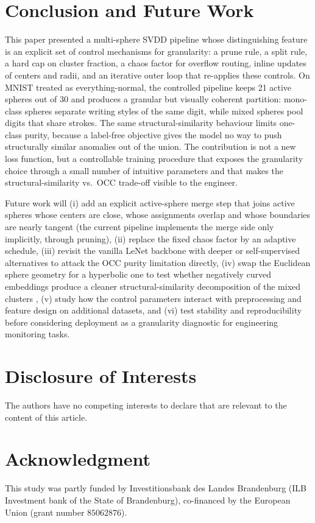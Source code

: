 \documentclass[conference]{IEEEtran}
\begin{document}
\section{Conclusion and Future Work}
This paper presented a multi-sphere SVDD pipeline whose distinguishing feature is an explicit set of control mechanisms for granularity: a prune rule, a split rule, a hard cap on cluster fraction, a chaos factor for overflow routing, inline updates of centers and radii, and an iterative outer loop that re-applies these controls. On MNIST \cite{lecun1998gradient} treated as everything-normal, the controlled pipeline keeps 21 active spheres out of 30 and produces a granular but visually coherent partition: mono-class spheres separate writing styles of the same digit, while mixed spheres pool digits that share strokes. The same structural-similarity behaviour limits one-class purity, because a label-free objective gives the model no way to push structurally similar anomalies out of the union. The contribution is not a new loss function, but a controllable training procedure that exposes the granularity choice through a small number of intuitive parameters and that makes the structural-similarity vs.\ OCC trade-off visible to the engineer.

Future work will (i) add an explicit active-sphere merge step that joins active spheres whose centers are close, whose assignments overlap and whose boundaries are nearly tangent (the current pipeline implements the merge side only implicitly, through pruning), (ii) replace the fixed chaos factor by an adaptive schedule, (iii) revisit the vanilla LeNet backbone with deeper or self-supervised alternatives to attack the OCC purity limitation directly, (iv) swap the Euclidean sphere geometry for a hyperbolic one to test whether negatively curved embeddings produce a cleaner structural-similarity decomposition of the mixed clusters \cite{nickel2017poincare,khrulkov2020hyperbolic}, (v) study how the control parameters interact with preprocessing and feature design on additional datasets, and (vi) test stability and reproducibility before considering deployment as a granularity diagnostic for engineering monitoring tasks.

\section*{Disclosure of Interests}
The authors have no competing interests to declare that are relevant to the content of this article.

\section*{Acknowledgment}

This study was partly funded by Investitionsbank des Landes Brandenburg (ILB Investment bank of the State of Brandenburg), co-financed by the European Union (grant number $85062876$).



\end{document}

